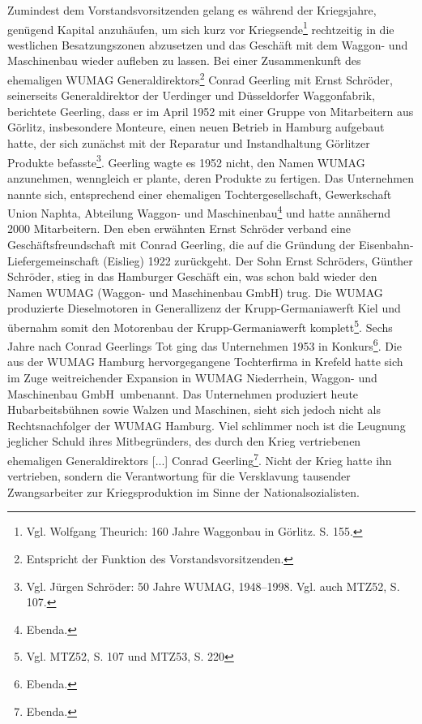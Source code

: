 \documentclass[a4paper,12pt,ngerman,
]{nisebook}
\begin{document}
Zumindest dem Vorstandsvorsitzenden gelang es während der Kriegsjahre, genügend Kapital anzuhäufen, um sich kurz vor Kriegsende\footnote{Vgl. Wolfgang Theurich: 160 Jahre Waggonbau in Görlitz. S. 155.} rechtzeitig in die westlichen Besatzungszonen abzusetzen und das Geschäft mit dem Waggon- und Maschinenbau wieder aufleben zu lassen.
\newline
Bei einer Zusammenkunft des ehemaligen WUMAG Generaldirektors\footnote{Entspricht der Funktion des Vorstandsvorsitzenden.} Conrad Geerling mit Ernst Schröder, seinerseits Generaldirektor der Uerdinger und Düsseldorfer Waggonfabrik, berichtete Geerling, dass er im April 1952 mit einer Gruppe von Mitarbeitern aus Görlitz, insbesondere Monteure, einen neuen Betrieb in Hamburg aufgebaut hatte, der sich zunächst mit der Reparatur und Instandhaltung Görlitzer Produkte befasste\footnote{Vgl. Jürgen Schröder: 50 Jahre WUMAG, 1948--1998. Vgl. auch MTZ52, S. 107.}.
Geerling wagte es 1952 nicht, den Namen WUMAG anzunehmen, wenngleich er plante, deren Produkte zu fertigen. Das Unternehmen nannte sich, entsprechend einer ehemaligen Tochtergesellschaft, \glqq Gewerkschaft Union Naphta, Abteilung Waggon- und Maschinenbau\grqq\footnote{Ebenda.} und hatte annähernd 2000 Mitarbeitern.
\newline
Den eben erwähnten Ernst Schröder verband eine Geschäftsfreundschaft mit Conrad Geerling, die auf die Gründung der Eisenbahn-Liefergemeinschaft (\glqq Eislieg\grqq) 1922 zurückgeht. Der Sohn Ernst Schröders, Günther Schröder, stieg in das Hamburger Geschäft ein, was schon bald wieder den Namen WUMAG (Waggon- und Maschinenbau GmbH) trug. Die WUMAG produzierte Dieselmotoren in Generallizenz der Krupp-Germaniawerft Kiel und übernahm somit den Motorenbau der Krupp-Germaniawerft komplett\footnote{Vgl. MTZ52, S. 107 und MTZ53, S. 220}.
Sechs Jahre nach Conrad Geerlings Tot ging das Unternehmen 1953 in Konkurs\footnote{Ebenda.}. Die aus der WUMAG Hamburg hervorgegangene Tochterfirma in Krefeld hatte sich im Zuge weitreichender Expansion in \glqq WUMAG Niederrhein, Waggon- und Maschinenbau GmbH\grqq~umbenannt. Das Unternehmen produziert heute Hubarbeitsbühnen sowie Walzen und Maschinen, sieht sich jedoch nicht als Rechtsnachfolger der WUMAG Hamburg. Viel schlimmer noch ist die Leugnung jeglicher Schuld ihres Mitbegründers, des \glqq durch den Krieg vertriebenen ehemaligen Generaldirektors [...] Conrad Geerling\grqq\footnote{Ebenda.}. Nicht der Krieg hatte ihn vertrieben, sondern die Verantwortung für die Versklavung tausender Zwangsarbeiter zur Kriegsproduktion im Sinne der Nationalsozialisten.
\end{document}
